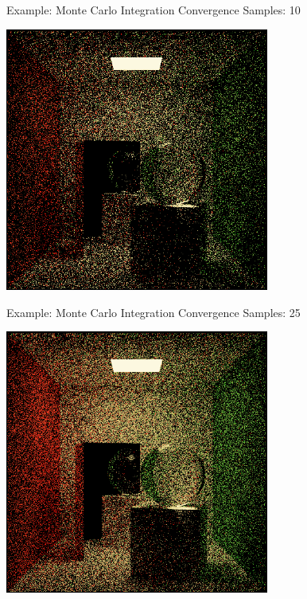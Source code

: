 \documentclass{beamer}
\begin{document}
\begin{frame}{Example: Monte Carlo Integration Convergence}
    Samples: 10
    \begin{center}
        \includegraphics[width=0.65\textwidth]{../img/convergence/cornell-00010.png}
    \end{center}
\end{frame}

\begin{frame}{Example: Monte Carlo Integration Convergence}
    Samples: 25
    \begin{center}
        \includegraphics[width=0.65\textwidth]{../img/convergence/cornell-00025.png}
    \end{center}
\end{frame}
\end{document}
